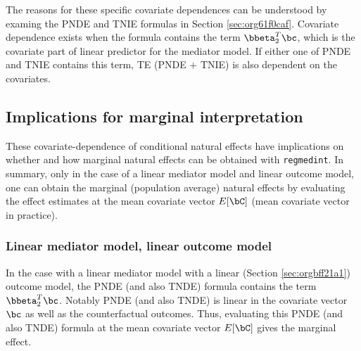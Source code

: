 \documentclass[dvipdfmx,10pt]{article}
\begin{document}
The reasons for these specific covariate dependences can be understood by examing the PNDE and TNIE formulas in Section \ref{sec:org61f0caf}. Covariate dependence exists when the formula contains the term \(\bbeta_{2}^{T}\bc\), which is the covariate part of linear predictor for the mediator model. If either one of PNDE and TNIE contains this term, TE (PNDE + TNIE) is also dependent on the covariates.\\

\subsection{Implications for marginal interpretation}
\label{sec:orgb392b6c}
These covariate-dependence of conditional natural effects have implications on whether and how marginal natural effects can be obtained with \texttt{regmedint}. In summary, only in the case of a linear mediator model and linear outcome model, one can obtain the marginal (population average) natural effects by evaluating the effect estimates at the mean covariate vector \(E[\bC]\) (mean covariate vector in practice).

\subsubsection{Linear mediator model, linear outcome model}
\label{sec:orgec8fc4d}
In the case with a linear mediator model with a linear (Section \ref{sec:orgbff21a1}) outcome model, the PNDE (and also TNDE) formula contains the term \(\bbeta_{2}^{T}\bc\). Notably PNDE (and also TNDE) is linear in the covariate vector \(\bc\) as well as the counterfactual outcomes. Thus, evaluating this PNDE (and also TNDE) formula at the mean covariate vector \(E[\bC]\) gives the marginal effect.
\end{document}
